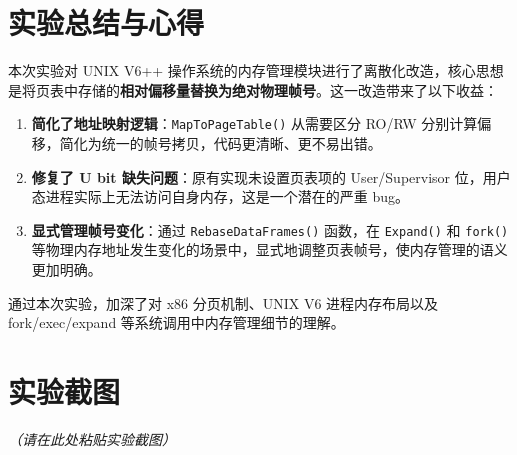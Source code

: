 \documentclass[12pt]{article}
\begin{document}
\section{实验总结与心得}

本次实验对 UNIX V6++ 操作系统的内存管理模块进行了离散化改造，核心思想是将页表中存储的\textbf{相对偏移量替换为绝对物理帧号}。这一改造带来了以下收益：

\begin{enumerate}
    \item \textbf{简化了地址映射逻辑}：\texttt{MapToPageTable()} 从需要区分 RO/RW 分别计算偏移，简化为统一的帧号拷贝，代码更清晰、更不易出错。
    \item \textbf{修复了 U bit 缺失问题}：原有实现未设置页表项的 User/Supervisor 位，用户态进程实际上无法访问自身内存，这是一个潜在的严重 bug。
    \item \textbf{显式管理帧号变化}：通过 \texttt{RebaseDataFrames()} 函数，在 \texttt{Expand()} 和 \texttt{fork()} 等物理内存地址发生变化的场景中，显式地调整页表帧号，使内存管理的语义更加明确。
\end{enumerate}

通过本次实验，加深了对 x86 分页机制、UNIX V6 进程内存布局以及 fork/exec/expand 等系统调用中内存管理细节的理解。

\section{实验截图}


\begin{center}
\textit{（请在此处粘贴实验截图）}
\end{center}

%
%
%
\end{document}

